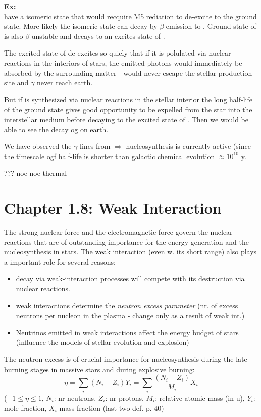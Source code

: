\documentclass[a4paper,12pt]{article}
\begin{document}
\textbf{Ex:} \\
 have a isomeric state that would recquire M5 rediation to de-excite to the ground state. More likely the isomeric state can decay by $\beta$-emission to . Ground state of  is also $\beta$-unstable and decays to an excites state of .

The excited state of  de-excites so quicly that if it is polulated via nuclear reactions in the interiors of stars, the emitted photons would immediately be absorbed by the surrounding matter - would never escape the stellar production site and $\gamma$ never reach earth.

But if  is synthesized via nuclear reactions in the stellar interior the long half-life of the ground state gives good opportunity to be expelled from the star into the interstellar medium before decaying to the excited state of . Then we would be able to see the decay og  on earth. 

We have observed the $\gamma$-lines from  $\Rightarrow$ nucleosynthesis is currently active (since the timescale ogf  half-life is shorter than galactic chemical evolution $\approx 10^10$ y.

???
noe noe thermal 

\section*{Chapter 1.8: Weak Interaction}
The strong nuclear force and the electromagnetic force govern the nuclear reactions that are of outstanding importance for the energy generation and the nucleosynthesis in stars. The weak interaction (even w. its short range) also plays a important role for several reasons:
\begin{itemize}
\item decay via weak-interaction processes will compete with its destruction via nuclear reactions.
\item weak interactions determine the \textit{neutron excess parameter} (nr. of excess neutrons per nucleon in the plasma - change only as a result of weak int.)
\item Neutrinos emitted in weak interactions affect the energy budget of stars (influence the models of stellar evolution and explosion)
\end{itemize}

The neutron excess is of crucial importance for nucleosynthesis during the late burning stages in massive stars and during explosive burning:
\begin{equation}
\eta = \sum_i (N_i - Z_i)Y_i = \sum_i \frac{(N_i - Z_i)}{M_i}X_i
\end{equation}
($-1 \leq \eta \leq 1$, $N_i$: nr neutrons, $Z_i$: nr protons, $M_i$: relative atomic mass (in u), $Y_i$: mole fraction, $X_i$ mass fraction (last two def. p. 40)
\end{document}
